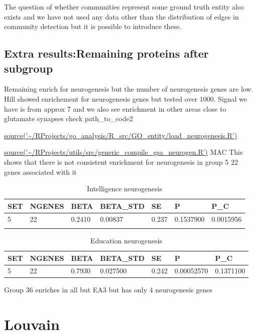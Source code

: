 The question of whether communities represent some ground truth entity also exists \cite{peel2017ground}  and we have not used any data other than the distribution of edges in community detection but it is possible to introduce these.  \cite{newman2016structure} 


 

\subsection{Extra results:Remaining proteins after subgroup}
Remaining enrich for neurogenesis but the number of neurogenesis genes are low. Hill showed enrichement for neurogenesis genes but tested over 1000. Signal we have is from approx 7 and we also see enrichment in other areas close to glutamate synapses
check path\_to\_code2

\url{source('~/RProjects/go_analysis/R_src/GO_entity/load_neurogenesis.R')}

\url{source('~/RProjects/utils/src/generic_compile_gsa_neurogen.R')} MAC
This shows that there is not consistent enrichment for neurogenesis in group 5 22 genes associated with it 
\begin{table}[]
    \centering
    \begin{tabular}{lllllll}
        SET& NGENES&    BETA &BETA\_STD  &  SE      &   P  & P\_C\\
        \hline
  5  &   22&  0.2410&  0.00837& 0.237& 0.1537900& 0.0015956\\   
         & 
    \end{tabular}
    \caption{Intelligence neurogenesis}
    \label{tab:Intelligence neurogenesis}
\end{table}

\begin{table}[]
    \centering
    \begin{tabular}{lllllll}
        SET& NGENES&    BETA &BETA\_STD  &  SE      &   P  & P\_C\\
        \hline
  5   &  22&  0.7930&  0.027500& 0.242& 0.00052570 &0.1371100\\

 \end{tabular}
    \caption{Education neurogenesis}
    \label{tab:Education neurogenesis}
\end{table}

Group 36 enriches in all but EA3 but has only 4 neurogenesis genes 


\section{Louvain}


